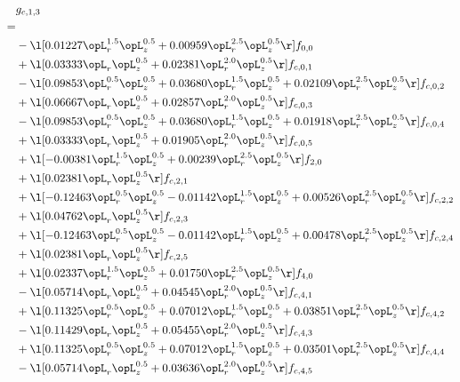 \begin{alignat}{2} 
\label{eq:g_13_0} 
& g_{c,1,3} \nonumber \\ 
 = \\ 
& - \l[  0.01227 \opL_r^{1.5} \opL_z^{0.5} +  0.00959 \opL_r^{2.5} \opL_z^{0.5}  \r] f_{0,0} \nonumber \\ 
& + \l[  0.03333 \opL_r \opL_z^{0.5} +  0.02381 \opL_r^{2.0} \opL_z^{0.5}  \r] f_{c,0,1} \nonumber \\ 
& - \l[  0.09853 \opL_r^{0.5} \opL_z^{0.5} +  0.03680 \opL_r^{1.5} \opL_z^{0.5} +  0.02109 \opL_r^{2.5} \opL_z^{0.5}  \r] f_{c,0,2} \nonumber \\ 
& + \l[  0.06667 \opL_r \opL_z^{0.5} +  0.02857 \opL_r^{2.0} \opL_z^{0.5}  \r] f_{c,0,3} \nonumber \\ 
& - \l[  0.09853 \opL_r^{0.5} \opL_z^{0.5} +  0.03680 \opL_r^{1.5} \opL_z^{0.5} +  0.01918 \opL_r^{2.5} \opL_z^{0.5}  \r] f_{c,0,4} \nonumber \\ 
& + \l[  0.03333 \opL_r \opL_z^{0.5} +  0.01905 \opL_r^{2.0} \opL_z^{0.5}  \r] f_{c,0,5} \nonumber \\ 
& + \l[  -0.00381 \opL_r^{1.5} \opL_z^{0.5} +  0.00239 \opL_r^{2.5} \opL_z^{0.5}  \r] f_{2,0} \nonumber \\ 
& + \l[  0.02381 \opL_r \opL_z^{0.5}  \r] f_{c,2,1} \nonumber \\ 
& + \l[  -0.12463 \opL_r^{0.5} \opL_z^{0.5}   -0.01142 \opL_r^{1.5} \opL_z^{0.5} +  0.00526 \opL_r^{2.5} \opL_z^{0.5}  \r] f_{c,2,2} \nonumber \\ 
& + \l[  0.04762 \opL_r \opL_z^{0.5}  \r] f_{c,2,3} \nonumber \\ 
& + \l[  -0.12463 \opL_r^{0.5} \opL_z^{0.5}   -0.01142 \opL_r^{1.5} \opL_z^{0.5} +  0.00478 \opL_r^{2.5} \opL_z^{0.5}  \r] f_{c,2,4} \nonumber \\ 
& + \l[  0.02381 \opL_r \opL_z^{0.5}  \r] f_{c,2,5} \nonumber \\ 
& + \l[  0.02337 \opL_r^{1.5} \opL_z^{0.5} +  0.01750 \opL_r^{2.5} \opL_z^{0.5}  \r] f_{4,0} \nonumber \\ 
& - \l[  0.05714 \opL_r \opL_z^{0.5} +  0.04545 \opL_r^{2.0} \opL_z^{0.5}  \r] f_{c,4,1} \nonumber \\ 
& + \l[  0.11325 \opL_r^{0.5} \opL_z^{0.5} +  0.07012 \opL_r^{1.5} \opL_z^{0.5} +  0.03851 \opL_r^{2.5} \opL_z^{0.5}  \r] f_{c,4,2} \nonumber \\ 
& - \l[  0.11429 \opL_r \opL_z^{0.5} +  0.05455 \opL_r^{2.0} \opL_z^{0.5}  \r] f_{c,4,3} \nonumber \\ 
& + \l[  0.11325 \opL_r^{0.5} \opL_z^{0.5} +  0.07012 \opL_r^{1.5} \opL_z^{0.5} +  0.03501 \opL_r^{2.5} \opL_z^{0.5}  \r] f_{c,4,4} \nonumber \\ 
& - \l[  0.05714 \opL_r \opL_z^{0.5} +  0.03636 \opL_r^{2.0} \opL_z^{0.5}  \r] f_{c,4,5} \nonumber \\ 
\end{alignat} 


